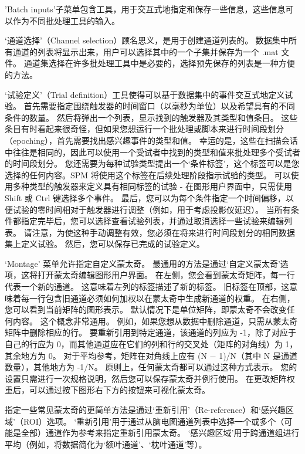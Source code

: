 'Batch inputs'子菜单包含工具，用于交互式地指定和保存一些信息，这些信息可以作为不同批处理工具的输入。

‘通道选择’（Channel selection）顾名思义，是用于创建通道列表的。
数据集中所有通道的列表将显示出来，用户可以选择其中的一个子集并保存为一个 .mat 文件。
通道集选择在许多批处理工具中是必要的，选择预先保存的列表是一种方便的方法。

‘试验定义’（Trial definition）工具使得可以基于数据集中的事件交互式地定义试验。
首先需要指定围绕触发器的时间窗口（以毫秒为单位）以及希望具有的不同条件的数量。
然后将弹出一个列表，显示找到的触发器及其类型和值条目。
这些条目有时看起来很奇怪，但如果您想运行一个批处理或脚本来进行时间段划分（epoching），首先需要找出感兴趣事件的类型和值。
幸运的是，这些在扫描会话中往往是相同的，因此可以使用一个受试者中找到的类型和值来批处理多个受试者的时间段划分。
您还需要为每种试验类型提出一个‘条件标签’，这个标签可以是您选择的任何内容。SPM 将使用这个标签在后续处理阶段指示试验的类型。
可以使用多种类型的触发器来定义具有相同标签的试验 - 在图形用户界面中，只需使用 Shift 或 Ctrl 键选择多个事件。
最后，您可以为每个条件指定一个时间偏移，以便试验的零时间相对于触发器进行调整（例如，用于考虑投影仪延迟）。
当所有条件都指定完毕后，您可以选择查看试验列表，并通过取消选择一些试验来编辑列表。
请注意，为使这种手动调整有效，您必须在将来进行时间段划分的相同数据集上定义试验。
然后，您可以保存已完成的试验定义。


‘Montage’ 菜单允许指定自定义蒙太奇。
最通用的方法是通过‘自定义蒙太奇’选项，这将打开蒙太奇编辑图形用户界面。
在左侧，您会看到蒙太奇矩阵，每一行代表一个新的通道。
这意味着左列的标签描述了新的标签。
旧标签在顶部，这意味着每一行包含旧通道必须如何加权以在蒙太奇中生成新通道的权重。
在右侧，您可以看到当前矩阵的图形表示。
默认情况下是单位矩阵，即蒙太奇不会改变任何内容。
这个概念非常通用。
例如，如果您想从数据中删除通道，只需从蒙太奇矩阵中删除相应的行。
要重新引用到特定通道，该通道的列应为 -1，除了对应于自己的行应为 0，而其他通道应在它们的列和行的交叉处（矩阵的对角线）为 1，其余地方为 0。
对于平均参考，矩阵在对角线上应有 (N − 1)/N（其中 N 是通道数量），其他地方为 -1/N。
原则上，任何蒙太奇都可以通过这种方式表示。
您的设置只需进行一次规格说明，然后您可以保存蒙太奇并例行使用。
在更改矩阵权重后，可以通过按下图形右下方的按钮来可视化蒙太奇。


指定一些常见蒙太奇的更简单方法是通过‘重新引用’（Re-reference）和‘感兴趣区域’（ROI）选项。
‘重新引用’用于通过从脑电图通道列表中选择一个或多个（可能是全部）通道作为参考来指定重新引用蒙太奇。
‘感兴趣区域’用于跨通道组进行平均（例如，将数据简化为‘额叶通道’、‘枕叶通道’等）。


